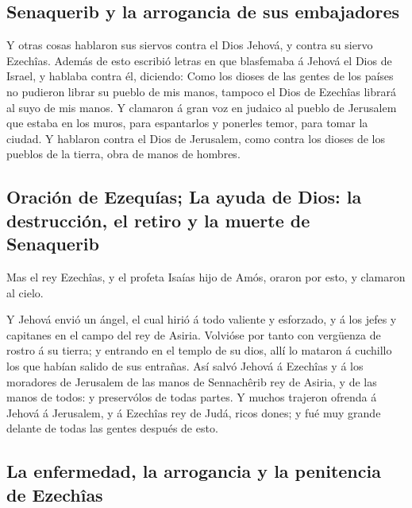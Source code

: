 \hypertarget{senaquerib-y-la-arrogancia-de-sus-embajadores}{%
\subsection{Senaquerib y la arrogancia de sus
embajadores}\label{senaquerib-y-la-arrogancia-de-sus-embajadores}}

 Y otras cosas hablaron sus siervos contra el Dios Jehová,
y contra su siervo Ezechîas.  Además de esto escribió
letras en que blasfemaba á Jehová el Dios de Israel, y hablaba contra
él, diciendo: Como los dioses de las gentes de los países no pudieron
librar su pueblo de mis manos, tampoco el Dios de Ezechîas librará al
suyo de mis manos.  Y clamaron á gran voz en judaico al
pueblo de Jerusalem que estaba en los muros, para espantarlos y ponerles
temor, para tomar la ciudad.  Y hablaron contra el Dios de
Jerusalem, como contra los dioses de los pueblos de la tierra, obra de
manos de hombres.

\hypertarget{oraciuxf3n-de-ezequuxedas-la-ayuda-de-dios-la-destrucciuxf3n-el-retiro-y-la-muerte-de-senaquerib}{%
\subsection{Oración de Ezequías; La ayuda de Dios: la destrucción, el
retiro y la muerte de
Senaquerib}\label{oraciuxf3n-de-ezequuxedas-la-ayuda-de-dios-la-destrucciuxf3n-el-retiro-y-la-muerte-de-senaquerib}}

 Mas el rey Ezechîas, y el profeta Isaías hijo de Amós,
oraron por esto, y clamaron al cielo.

 Y Jehová envió un ángel, el cual hirió á todo valiente y
esforzado, y á los jefes y capitanes en el campo del rey de Asiria.
Volvióse por tanto con vergüenza de rostro á su tierra; y entrando en el
templo de su dios, allí lo mataron á cuchillo los que habían salido de
sus entrañas.  Así salvó Jehová á Ezechîas y á los
moradores de Jerusalem de las manos de Sennachêrib rey de Asiria, y de
las manos de todos: y preservólos de todas partes.  Y
muchos trajeron ofrenda á Jehová á Jerusalem, y á Ezechîas rey de Judá,
ricos dones; y fué muy grande delante de todas las gentes después de
esto.

\hypertarget{la-enfermedad-la-arrogancia-y-la-penitencia-de-ezechuxeeas}{%
\subsection{La enfermedad, la arrogancia y la penitencia de
Ezechîas}\label{la-enfermedad-la-arrogancia-y-la-penitencia-de-ezechuxeeas}}

